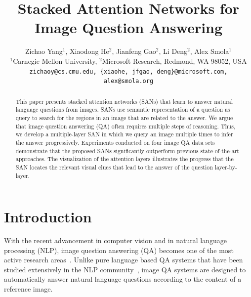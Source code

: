 \documentclass[10pt,twocolumn,letterpaper]{article}
\begin{document}
\title{Stacked Attention Networks for Image Question Answering}

\author{
Zichao Yang$^{1}$,
Xiaodong He$^{2}$,
Jianfeng Gao$^{2}$,
Li Deng$^{2}$,
Alex Smola$^{1}$ \\
$^{1}$Carnegie Mellon University,
$^{2}$Microsoft Research, Redmond, WA 98052, USA\\
\texttt{zichaoy@cs.cmu.edu,
\{xiaohe, jfgao, deng\}@microsoft.com,
alex@smola.org}
}

\maketitle

\begin{abstract}
  This paper presents stacked attention networks (SANs) that learn to answer
  natural language questions from images. SANs use semantic representation of a
  question as query to search for the regions in an image that are related to
  the answer. We argue that image question answering (QA) often requires
  multiple steps of reasoning. Thus, we develop a multiple-layer SAN in which
  we query an image multiple times to infer the answer
  progressively. Experiments conducted on four image QA data sets demonstrate
  that the proposed SANs significantly outperform previous state-of-the-art
  approaches. The visualization of the attention layers illustrates the
  progress that the SAN locates the relevant visual clues that lead to the
  answer of the question layer-by-layer.
\end{abstract}

\vspace{-0.3cm}
\section{Introduction}
With the recent advancement in computer vision and in natural language
processing (NLP), image question answering (QA) becomes one of the most active
research areas~\cite{gao2015you, ren2015imageqa, malinowski2014multi,
  antol2015vqa, malinowski2015ask}. Unlike pure language based QA systems that
have been studied extensively in the NLP community~\cite{weston2014memory,
  kumar2015ask, bordes2014question, yih2015semantic, berant2014semantic,
  yih2014semantic}, image QA systems are designed to automatically answer
natural language questions according to the content of a reference image.
\end{document}
